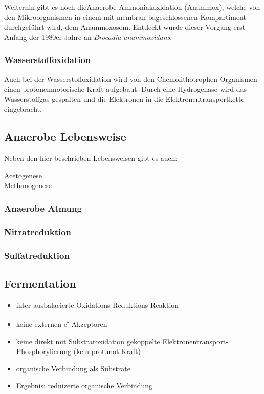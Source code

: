 Weiterhin gibt es noch dieAnaerobe Ammoniakoxidation (Anammox),
welche von den Mikroorganismen in einem mit membran bageschlossenen Kompartiment 
durchgeführt wird,
dem Anammoxosom.
Entdeckt wurde dieser Vorgang erst Anfang der 1980er Jahre an \emph{Brocadia anammoxidans}.
\\

\subsubsection{Wasserstoffoxidation}
Auch bei der Wasserstoffoxidation wird von den Chemolithotrophen Organismen
einen protonenmotorische Kraft aufgebaut.
Durch eine Hydrogenase wird das Wasserstoffgas gespalten
und die Elektronen in die Elektronentransportkette eingebracht.

\subsection{Anaerobe Lebensweise}
Neben den hier beschrieben Lebensweisen gibt es auch:
\begin{description}
	\item[Acetogenese]
	\item[Methanogenese]
\end{description}

\subsubsection{Anaerobe Atmung}
\subsubsection{Nitratreduktion}
\subsubsection{Sulfatreduktion}

\subsection{Fermentation}
\begin{itemize}
	\item inter ausbalacierte Oxidations-Reduktions-Reaktion
	\item keine externen e\textsuperscript{-}-Akzeptoren
	\item keine direkt mit Substratoxidation gekoppelte Elektronentransport-Phosphorylierung (kein prot.mot.Kraft)
	\item organische Verbindung als Substrate
	\item Ergebnis: reduizerte organische Verbindung
\end{itemize}

